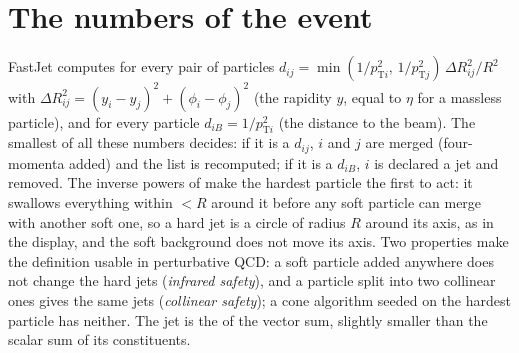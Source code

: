 \section{The numbers of the event}

\begin{plainwords}
FastJet computes for every pair of particles $d_{ij}=\min(1/p_{\mathrm{T}i}^2,\,1/p_{\mathrm{T}j}^2)\,
\Delta R_{ij}^2/R^2$ with $\Delta R_{ij}^2=(y_i-y_j)^2+(\phi_i-\phi_j)^2$ (the rapidity $y$, equal to $\eta$ for a
massless particle), and for every particle
$d_{iB}=1/p_{\mathrm{T}i}^2$ (the distance to the beam). The smallest of all these numbers decides: if it is a
$d_{ij}$, $i$ and $j$ are merged (four-momenta added) and the list is recomputed; if it is a $d_{iB}$, $i$ is
declared a jet and removed. The inverse powers of \pt{} make the hardest particle the first to act: it
swallows everything within \dR$<R$ around it before any soft particle can merge with another soft one, so a
hard jet is a circle of radius $R$ around its axis, as in the display, and the soft background does not move
its axis. Two properties make the definition usable in perturbative QCD: a soft particle added anywhere does
not change the hard jets (\emph{infrared safety}), and a particle split into two collinear ones gives the
same jets (\emph{collinear safety}); a cone algorithm seeded on the hardest particle has neither. The jet
\pt{} is the \pt{} of the vector sum, slightly smaller than the scalar sum of its constituents.
\end{plainwords}

